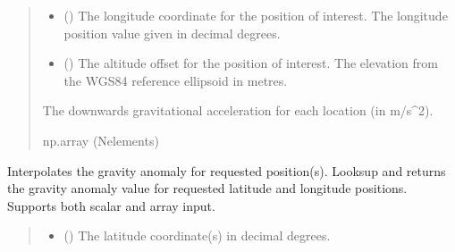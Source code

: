 \documentclass[letterpaper,10pt,english]{sphinxmanual}
\begin{document}
\begin{fulllineitems}
\begin{fulllineitems}
\begin{quote}
\begin{description}
\begin{itemize}
\item {} 
\sphinxAtStartPar
{} () \textendash{} The longitude coordinate for the position of interest.
The longitude position value given in decimal degrees.

\item {} 
\sphinxAtStartPar
{} () \textendash{} The altitude offset for the position of interest.
The elevation from the WGS\sphinxhyphen{}84 reference ellipsoid in metres.

\end{itemize}

\sphinxAtStartPar
The downwards gravitational acceleration for each location
(in m/s\textasciicircum{}2).

\sphinxAtStartPar
np.array (N\sphinxhyphen{}elements)

\end{description}\end{quote}

\end{fulllineitems}


\begin{fulllineitems}
\label{\detokenize{modules/gravity/geosat:qnav.gravity.geosat.Geosat44.get_map_value}}
\pysigstartsignatures
{}
\pysigstopsignatures
\sphinxAtStartPar
Interpolates the gravity anomaly for requested position(s).
Looks\sphinxhyphen{}up and returns the gravity anomaly value for requested latitude
and longitude positions. Supports both scalar and array input.
\begin{quote}\begin{description}
\begin{itemize}
\item {} 
\sphinxAtStartPar
{} (\sphinxstyleliteralemphasis{\sphinxupquote{ | }}) \textendash{} The latitude coordinate(s) in decimal degrees.


\end{itemize}
\end{description}
\end{quote}
\end{fulllineitems}
\end{fulllineitems}
\end{document}
